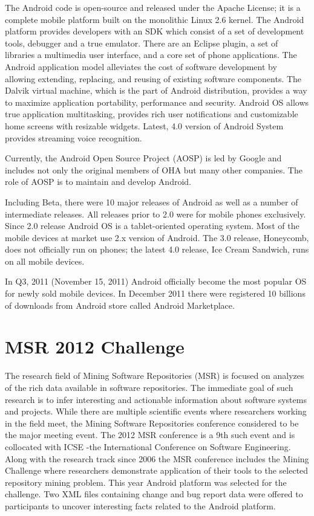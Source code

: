 \documentclass[a4paper,10pt]{article}
\numberwithin{equation}{subsection}
\begin{document}
The Android code is open-source and released under the Apache License; it is a complete 
mobile platform built on the monolithic Linux 2.6 kernel. The Android platform provides 
developers with an SDK which consist of a set of development tools, debugger and a true emulator. 
There are an Eclipse plugin, a set of libraries a multimedia user interface, and a core set of 
phone applications. The Android application model alleviates the cost of software development by 
allowing extending, replacing, and reusing of existing software components. The Dalvik virtual 
machine, which is the part of Android distribution, provides a way to maximize application portability, 
performance and security. Android OS allows true application multitasking, provides rich user 
notifications and customizable home screens with resizable widgets. Latest, 4.0 version of
Android System provides streaming voice recognition.

Currently, the Android Open Source Project (AOSP) is led by Google and includes not only the 
original members of OHA but many other companies. The role of AOSP is to maintain and develop 
Android.

Including Beta, there were 10 major releases of Android as well as a number of intermediate 
releases. All releases prior to 2.0 were for mobile phones exclusively. Since 2.0 release 
Android OS is a tablet-oriented operating system. Most of the mobile devices at market use 
2.x version of Android. The 3.0 release, Honeycomb, does not officially run on phones; 
the latest 4.0 release, Ice Cream Sandwich, runs on all mobile devices.

In Q3, 2011 (November 15, 2011) Android officially become the most popular OS for newly sold mobile 
devices. In December 2011 there were registered 10 billions of downloads from Android store called
Android Marketplace. 

\section{MSR 2012 Challenge}
The research field of Mining Software Repositories (MSR) is focused on analyzes of the rich 
data available in software repositories. The immediate goal of such research is to infer interesting 
and actionable information about software systems and projects. While there are multiple scientific 
events where researchers working in the field meet, the Mining Software Repositories 
conference considered to be the major meeting event. The 2012 MSR conference is a 9th such event
and is collocated with ICSE -the International Conference on Software Engineering.
Along with the research track since 2006 the MSR conference includes the Mining Challenge where 
researchers demonstrate application of their tools to the selected repository mining problem. This
year Android platform was selected for the challenge. Two XML files containing change and bug report 
data were offered to participants to uncover interesting facts related to the Android platform.
\end{document}
